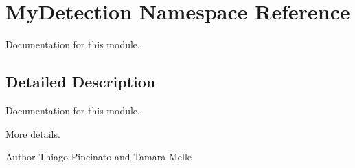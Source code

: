 \hypertarget{namespaceMyDetection}{}\section{My\+Detection Namespace Reference}
\label{namespaceMyDetection}


Documentation for this module.  




\subsection{Detailed Description}
Documentation for this module. 

More details. \begin{DoxyAuthor}{Author}
Thiago Pincinato and Tamara Melle 
\end{DoxyAuthor}

